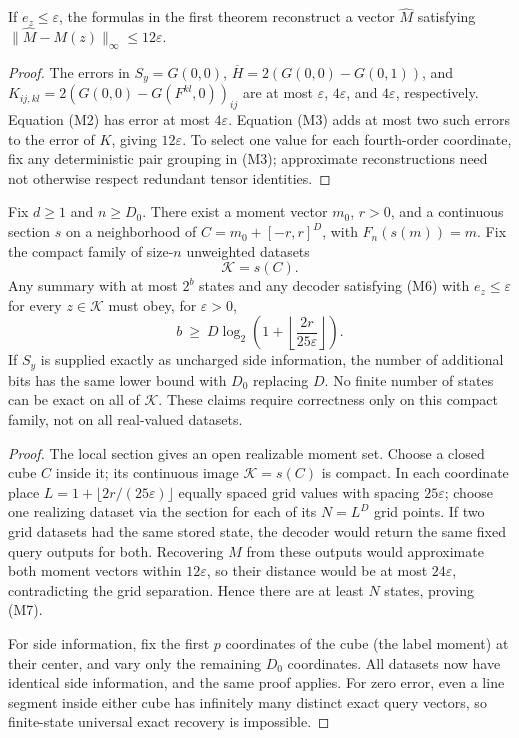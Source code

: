 \begin{lemma}
\label{lem:memory-stability}
If $e_z\le\varepsilon$, the formulas in the first theorem reconstruct
a vector $\widehat M$ satisfying
$\|\widehat M-M(z)\|_\infty\le12\varepsilon$.
\end{lemma}
\begin{proof}
The errors in $S_y=G(0,0)$, $\overline H=2(G(0,0)-G(0,1))$,
and $K_{ij,kl}=2(G(0,0)-G(F^{kl},0))_{ij}$ are at most
$\varepsilon$, $4\varepsilon$, and $4\varepsilon$, respectively.
Equation (M2) has error at most $4\varepsilon$. Equation (M3) adds at
most two such errors to the error of $K$, giving $12\varepsilon$.
To select one value for each fourth-order coordinate, fix any
deterministic pair grouping in (M3); approximate reconstructions need
not otherwise respect redundant tensor identities.
\end{proof}

\begin{theorem}
\label{thm:memory-bits}
Fix $d\ge1$ and $n\ge D_0$. There exist a moment vector $m_0$,
$r>0$, and a continuous section $s$ on a neighborhood of
$C=m_0+[-r,r]^D$, with $F_n(s(m))=m$. Fix the compact family of
size-$n$ unweighted datasets
\[
 \mathcal K=s(C).
\]
Any summary with at most $2^b$ states and any decoder satisfying
(M6) with $e_z\le\varepsilon$ for every $z\in\mathcal K$ must obey,
for $\varepsilon>0$,
\[
 b\ \ge\ D\log_2\left(1+\left\lfloor
                   \frac{2r}{25\varepsilon}\right\rfloor\right).
 \tag{M7}
\]
If $S_y$ is supplied exactly as uncharged side information, the
number of additional bits has the same lower bound with $D_0$
replacing $D$. No finite number of states can be exact on all of
$\mathcal K$. These claims require correctness only on this compact
family, not on all real-valued datasets.
\end{theorem}
\begin{proof}
The local section gives an open realizable moment set. Choose a
closed cube $C$ inside it; its continuous image $\mathcal K=s(C)$
is compact. In each coordinate place
$L=1+\lfloor2r/(25\varepsilon)\rfloor$ equally spaced grid values
with spacing $25\varepsilon$; choose one realizing dataset via the
section for each of its $N=L^D$ grid points. If two grid datasets
had the same stored state, the decoder would return the same fixed
query outputs for both. Recovering $M$ from these outputs would
approximate both moment vectors within $12\varepsilon$, so their
distance would be at most $24\varepsilon$, contradicting the grid
separation. Hence there are at least $N$ states, proving (M7).

For side information, fix the first $p$ coordinates of the cube
(the label moment) at their center, and vary only the remaining
$D_0$ coordinates. All datasets now have identical side information,
and the same proof applies. For zero error, even a line segment
inside either cube has infinitely many distinct exact query vectors,
so finite-state universal exact recovery is impossible.
\end{proof}


